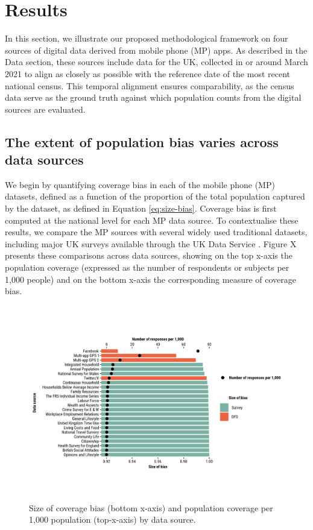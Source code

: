 \documentclass[]{rsos}%
\begin{document}
\section{Results}\label{results}

In this section, we illustrate our proposed methodological framework on
four sources of digital data derived from mobile phone (MP) apps. As
described in the Data section, these sources include data for the UK,
collected in or around March 2021 to align as closely as possible with
the reference date of the most recent national census. This temporal
alignment ensures comparability, as the census data serve as the ground
truth against which population counts from the digital sources are
evaluated.

\subsection{The extent of population bias varies across data sources}\label{the-extent-of-population-bias-varies-across-data-sources}

We begin by quantifying coverage bias in each of the mobile phone (MP)
datasets, defined as a function of the proportion of the total
population captured by the dataset, as defined in Equation
\ref{eq:size-bias}. Coverage bias is first computed at the national
level for each MP data source. To contextualise these results, we
compare the MP sources with several widely used traditional datasets,
including major UK surveys available through the UK Data Service
\citep{ukdataserviceSurveysData}. Figure X presents these comparisons across
data sources, showing on the top x-axis the population coverage
(expressed as the number of respondents or subjects per 1,000 people)
and on the bottom x-axis the corresponding measure of coverage bias.

\begin{figure}
\centering
\includegraphics[width=14cm,height=8.5cm]{figures/compare-surveys-legend.png}
\caption{Size of coverage bias (bottom x-axis) and population coverage per 1,000 population (top-x-axis) by data source.}\label{fig:survey}
\end{figure}
\end{document}
